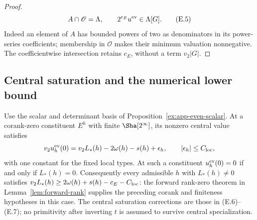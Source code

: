 \begin{proof}
\[
              A\cap\mathscr O=\Lambda,\qquad
                  2^{c_E}u^{\rm ev}\in\Lambda[G].                 \tag{E.5}
\]
Indeed an element of $A$ has bounded powers of two as denominators
in its power-series coefficients; membership in $\mathscr O$ makes
their minimum valuation nonnegative. The coefficientwise intersection
retains $c_E$, without a term $v_2|G|$.
\end{proof}

\subsection{Central saturation and the numerical lower bound}
\begin{proposition}\label{ex:app-central-calibration}
Use the scalar and determinant basis of
Proposition~\ref{ex:app-even-scalar}. At a corank-zero constituent
$E^h$ with finite $\Sha[2^\infty]$, its nonzero central value satisfies
\[
 v_2u_h^{\rm ev}(0)=v_2L_*(h)-2\omega(h)-s(h)+\epsilon_h,
 \qquad |\epsilon_h|\le C_{\rm loc},
\]
with one constant for the fixed local types. At such a constituent
$u_h^{\rm ev}(0)=0$ if and only if $L_*(h)=0$.
Consequently every admissible $h$ with $L_*(h)\ne0$ satisfies
$v_2L_*(h)\ge2\omega(h)+s(h)-c_E-C_{\rm loc}$: the forward
rank-zero theorem in Lemma~\ref{lem:forward-rank} supplies the
preceding corank and finiteness hypotheses in this case. The central saturation corrections are those
in (E.6)--(E.7); no primitivity after inverting $t$ is assumed to
survive central specialization.
\end{proposition}
